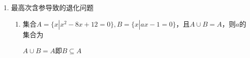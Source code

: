 \begin{enumerate}
\begin{enumerate}
        \begin{jieda}
            \ps 穿针引线法求解，奇穿偶回，\textbf{偶次方根绝对不能丢弃，且易出错}.
        \end{jieda}
        \item 已知集合$A = \{x | \dfrac{2x-1}{x^2+3x+2} > 0\}, B = \{x | x^2 + ax + b \leq 0\}$，且$A \cap B = \{x | \dfrac{1}{2} < x \leq 3\}$，求实数$a, b$的取值范围.
        \begin{jieda}
            解分式不等式有$A = (-2, -1) \cup (\dfrac{1}{2}, +\infty)$，设$B = [m, n]$，则根据$A \cap B = \{x | \dfrac{1}{2} < x \leq 3\}$可知$n = 3, m \in [-1, \dfrac{1}{2}]$，根据韦达定理有$a = -(3+m) \in \left[-\dfrac{7}{2}, -2\right]$，$b = 3m \in \left[-3, \dfrac{3}{2}\right]$
        \end{jieda}
        \item 已知$a, b \in \mathbf{R}$且$ab \neq 0$，对任意$x \geq 0$均有$(x-a)(x-b)(x-2a-b) \geq 0$，则
        \begin{jieda}
            穿针引线绘制出函数图像草图。函数图像和$x$轴有三个公共点，横坐标为$a, b, 2a+b$。
            \begin{enumerate}
                \item 若三个点均在原点左侧，则满足题意，此时$a < 0, b < 0$
                \item 若有点在$x$轴右侧，则必然左侧有一个点，右侧有两个重合的点才能满足题意，此时绘制函数图像草图可知函数图像和$x$轴在两个重合的点出相切。唯一的可能是$a > 0, b = -a$，此时$a$和$2a+b$相等。
            \end{enumerate}
            综上必有$b < 0$
        \end{jieda}
    \end{enumerate}
    \item 最高次含参导致的退化问题
    \begin{enumerate}
        \item 集合$A = \{x | x^2-8x+12 = 0\}, B = \{x | ax-1 = 0\}$，且$A \cup B = A$，则$a$的集合为
        \begin{jieda}
            $A \cup B = A$即$B \subseteq A$
        \end{jieda}
        

\end{enumerate}
\end{enumerate}
